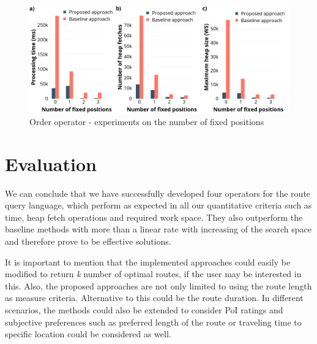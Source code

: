 \enlargethispage*{30pt}

\begin{figure}[H]
	\includegraphics[scale=0.33]{images/order.png}
	\centering
	\caption{Order operator - experiments on the number of fixed positions}
	\label{fig:order}
\end{figure}

\section{Evaluation}
\label{sec:eval}

We can conclude that we have successfully developed four operators for the route query language, which perform as expected in all our quantitative criteria such as time, heap fetch operations and required work space. They also outperform the baseline methods with more than a linear rate with increasing of the search space and therefore prove to be effective solutions.

It is important to mention that the implemented approaches could easily be modified to return \textit{k} number of optimal routes, if the user may be interested in this. Also, the proposed approaches are not only limited to using the route length  as measure criteria. Alternative to this could be the route duration. In different scenarios, the methods could also be extended to consider PoI ratings and subjective preferences such as preferred length of the route or traveling time to  specific location could be considered as well.  

